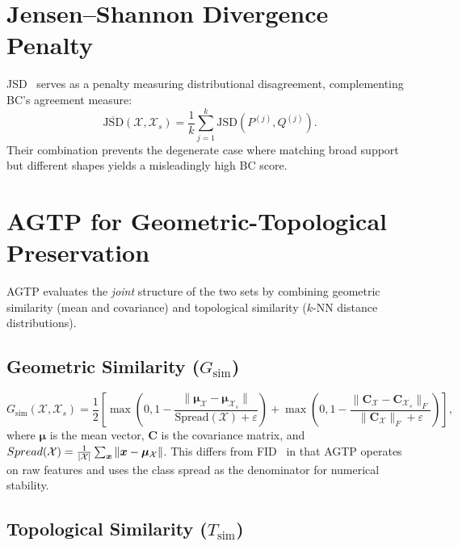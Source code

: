 \section{Jensen--Shannon Divergence Penalty}
\label{sec:seed:jsd}

JSD~\cite{lin1991divergence} serves as a penalty measuring distributional disagreement, complementing BC's agreement measure:
\begin{equation}
  \overline{\mathrm{JSD}}(\mathcal{X}, \mathcal{X}_s) = \frac{1}{k}\sum_{j=1}^k \mathrm{JSD}(P^{(j)}, Q^{(j)}).
  \label{eq:jsd_seed}
\end{equation}
Their combination prevents the degenerate case where matching broad support but different shapes yields a misleadingly high BC score.

\section{AGTP for Geometric-Topological Preservation}
\label{sec:seed:agtp}

AGTP evaluates the \emph{joint} structure of the two sets by combining geometric similarity (mean and covariance) and topological similarity ($k$-NN distance distributions).

\subsection{Geometric Similarity ($G_{\mathrm{sim}}$)}

\begin{equation}
  G_{\mathrm{sim}}(\mathcal{X}, \mathcal{X}_s) = \frac{1}{2}\left[\max\!\left(0, 1 - \frac{\|\bm{\mu}_{\mathcal{X}} - \bm{\mu}_{\mathcal{X}_s}\|}{\mathrm{Spread}(\mathcal{X}) + \varepsilon}\right) + \max\!\left(0, 1 - \frac{\|\mathbf{C}_{\mathcal{X}} - \mathbf{C}_{\mathcal{X}_s}\|_F}{\|\mathbf{C}_{\mathcal{X}}\|_F + \varepsilon}\right)\right],
  \label{eq:geom_sim}
\end{equation}
where $\bm{\mu}$ is the mean vector, $\mathbf{C}$ is the covariance matrix, and $Spread(\mathcal{X}) = \frac{1}{|\mathcal{X}|}\sum_{\bm{x}}\|\bm{x} - \bm{\mu}_{\mathcal{X}}\|$.
This differs from FID~\cite{heusel2017gans} in that AGTP operates on raw features and uses the class spread as the denominator for numerical stability.

\subsection{Topological Similarity ($T_{\mathrm{sim}}$)}

